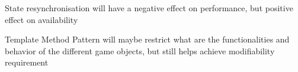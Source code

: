 

\begin{description}[style=nextline]
  \item[T1\label{t1}] State resynchronisation will have a negative effect on performance, but positive effect on availability
  \item[T2\label{t2}] Template Method Pattern will maybe restrict what are the functionalities and behavior of the different game objects, but still helps achieve modifiability requirement 
\end{description}
